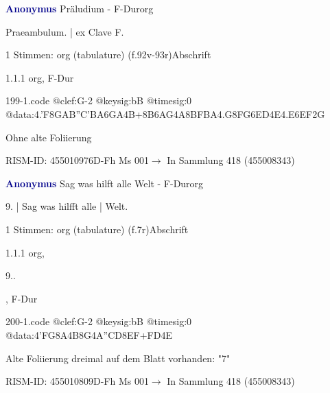 \documentclass[twocolumn, 12pt]{book}
\begin{document}
\par \vspace{16pt} \textcolor{darkblue}{\textbf{Anonymus  }}\hfillplus{\textbf{[199]}}\newline Präludium - F-Dur\newline org
\par \begin{itshape}[f.92v, at left:] Praeambulum. | ex Clave F.\end{itshape} 
\par \textcolor{darkblue}{}  1 Stimmen: org (tabulature)  (f.92v-93r)\newline Abschrift
\par 1.1.1  org, F-Dur  
\begin{filecontents*}{199-1.code}
@clef:G-2
@keysig:bB
@timesig:0
@data:4.'F8G{AB''C'B}{A6GA}4B+{8B6AG}4A{8BFBA}4.G8F{G6ED}4E4.E{6EF}2G
\end{filecontents*}
\newline %
\par Ohne alte Foliierung
\par RISM-ID: 455010976\newline D-Fh  Ms 001\newline $\rightarrow$ In Sammlung 418 (455008343)
      
\par \vspace{16pt} \textcolor{darkblue}{\textbf{Anonymus  }}\hfillplus{\textbf{[200]}}\newline Sag was hilft alle Welt - F-Dur\newline org
\par \begin{itshape}[f.7r, at left:] 9. | Sag was hilfft alle | Welt.\end{itshape} 
\par \textcolor{darkblue}{}  1 Stimmen: org (tabulature)  (f.7r)\newline Abschrift
\par 1.1.1  org, \begin{itshape}9..\end{itshape}, F-Dur  
\begin{filecontents*}{200-1.code}
@clef:G-2
@keysig:bB
@timesig:0
@data:4'FG8A4B8G4A''CD{8EF+}{FD}4E
\end{filecontents*}
\newline %
\par Alte Foliierung dreimal auf dem Blatt vorhanden: "7"
\par RISM-ID: 455010809\newline D-Fh  Ms 001\newline $\rightarrow$ In Sammlung 418 (455008343)
      
\end{document}
